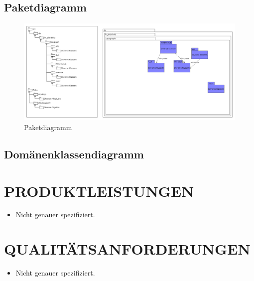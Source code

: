	\subsection{Paketdiagramm}
		\begin{figure}[H]
			\centering
			\includegraphics[width=0.7\linewidth]{images/Paketdiagramm}
			\caption{Paketdiagramm}
			\label{fig:Paketdiagramm}
		\end{figure}
	\subsection{Domänenklassendiagramm}
	\section{\Large PRODUKTLEISTUNGEN}
	\begin{itemize}
		\item Nicht genauer spezifiziert.
	\end{itemize} 
		
	
	\section{\Large QUALITÄTSANFORDERUNGEN}
	\begin{itemize}
		\item Nicht genauer spezifiziert.
	\end{itemize}
	
